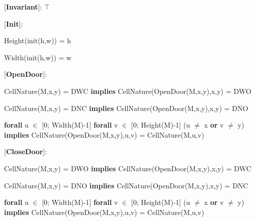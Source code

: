 \documentclass[11pt]{article}
\begin{document}
[\textbf{Invariant}]:  $\top$

[\textbf{Init}]: 

Height(init(h,w)) = h

Width(init(h,w)) = w

[\textbf{OpenDoor}]:

CellNature(M,x,y) = DWC \textbf{implies} CellNature(OpenDoor(M,x,y),x,y) = DWO

CellNature(M,x,y) = DNC \textbf{implies} CellNature(OpenDoor(M,x,y),x,y) = DNO

\textbf{forall} u $\in$ [0; Width(M)-1] \textbf{forall} v $\in$ [0; Height(M)-1] (u $\neq$ x \textbf{or} v $\neq$ y)
\textbf{implies} CellNature(OpenDoor(M,x,y),u,v) = CellNature(M,u,v)

[\textbf{CloseDoor}]:

CellNature(M,x,y) = DWO \textbf{implies} CellNature(OpenDoor(M,x,y),x,y) = DWC

CellNature(M,x,y) = DNO \textbf{implies} CellNature(OpenDoor(M,x,y),x,y) = DNC

\textbf{forall} u $\in$ [0; Width(M)-1] \textbf{forall} v $\in$ [0; Height(M)-1] (u $\neq$ x \textbf{or} v $\neq$ y)
\textbf{implies} CellNature(OpenDoor(M,x,y),u,v) = CellNature(M,u,v)
\end{document}
